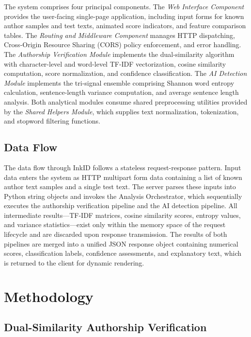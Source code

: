 \documentclass[conference]{IEEEtran}
\begin{document}
The system comprises four principal components. The \textit{Web Interface
Component} provides the user-facing single-page application, including input
forms for known author samples and test texts, animated score indicators, and
feature comparison tables. The \textit{Routing and Middleware Component}
manages HTTP dispatching, Cross-Origin Resource Sharing (CORS) policy
enforcement, and error handling. The \textit{Authorship Verification Module}
implements the dual-similarity algorithm with character-level and word-level
TF-IDF vectorization, cosine similarity computation, score normalization, and
confidence classification. The \textit{AI Detection Module} implements the
tri-signal ensemble comprising Shannon word entropy calculation,
sentence-length variance computation, and average sentence length analysis.
Both analytical modules consume shared preprocessing utilities provided by the
\textit{Shared Helpers Module}, which supplies text normalization, tokenization,
and stopword filtering functions.

\subsection{Data Flow}

The data flow through InkID follows a stateless request-response pattern.
Input data enters the system as HTTP multipart form data containing a list of
known author text samples and a single test text. The server parses these
inputs into Python string objects and invokes the Analysis Orchestrator, which
sequentially executes the authorship verification pipeline and the AI detection
pipeline. All intermediate results—TF-IDF matrices, cosine similarity scores,
entropy values, and variance statistics—exist only within the memory space of
the request lifecycle and are discarded upon response transmission. The results
of both pipelines are merged into a unified JSON response object containing
numerical scores, classification labels, confidence assessments, and
explanatory text, which is returned to the client for dynamic rendering.

\section{Methodology}
\label{sec:methodology}

\subsection{Dual-Similarity Authorship Verification}
\end{document}
